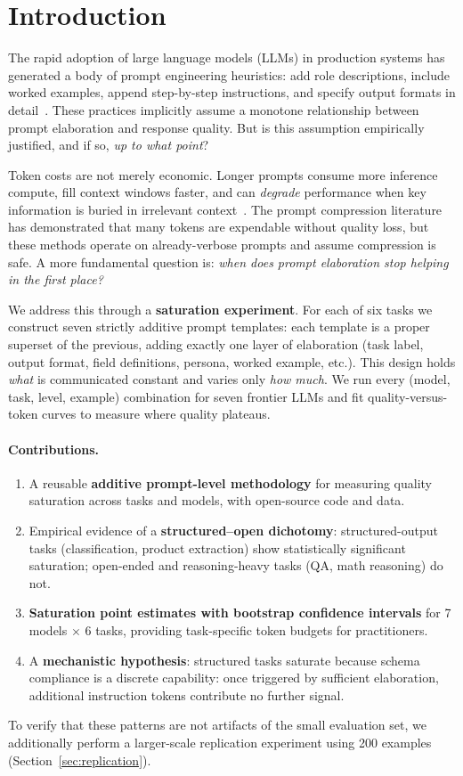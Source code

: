 \section{Introduction}
\label{sec:intro}

The rapid adoption of large language models (LLMs) in production systems
has generated a body of prompt engineering heuristics: add role descriptions,
include worked examples, append step-by-step instructions, and specify output
formats in detail~\citep{brown2020gpt3,wei2022cot,zhou2022large}.
These practices implicitly assume a monotone relationship between prompt
elaboration and response quality.
But is this assumption empirically justified, and if so, \emph{up to what
point}?

Token costs are not merely economic.
Longer prompts consume more inference compute, fill context windows faster,
and can \emph{degrade} performance when key information is buried in
irrelevant context~\citep{liu2023lost}.
The prompt compression
literature~\citep{jiang2023llmlingua,pan2024llmlingua2} has demonstrated
that many tokens are expendable without quality loss, but these methods
operate on already-verbose prompts and assume compression is safe.
A more fundamental question is: \emph{when does prompt elaboration stop
helping in the first place?}

We address this through a \textbf{saturation experiment}.
For each of six tasks we construct seven strictly additive prompt templates:
each template is a proper superset of the previous, adding exactly one layer
of elaboration (task label, output format, field definitions, persona, worked
example, etc.).
This design holds \emph{what} is communicated constant and varies only
\emph{how much}.
We run every (model, task, level, example) combination for seven frontier
LLMs and fit quality-versus-token curves to measure where quality plateaus.

\paragraph{Contributions.}
\begin{enumerate}
  \item A reusable \textbf{additive prompt-level methodology} for measuring
    quality saturation across tasks and models, with open-source code and data.
  \item Empirical evidence of a \textbf{structured--open dichotomy}:
    structured-output tasks (classification, product extraction) show
    statistically significant saturation; open-ended and reasoning-heavy tasks
    (QA, math reasoning) do not.
  \item \textbf{Saturation point estimates with bootstrap confidence intervals}
    for 7 models $\times$ 6 tasks, providing task-specific token budgets for
    practitioners.
  \item A \textbf{mechanistic hypothesis}: structured tasks saturate because
    schema compliance is a discrete capability: once triggered by sufficient
    elaboration, additional instruction tokens contribute no further signal.
\end{enumerate}

To verify that these patterns are not artifacts of the small evaluation set,
we additionally perform a larger-scale replication experiment using 200
examples (Section~\ref{sec:replication}).
